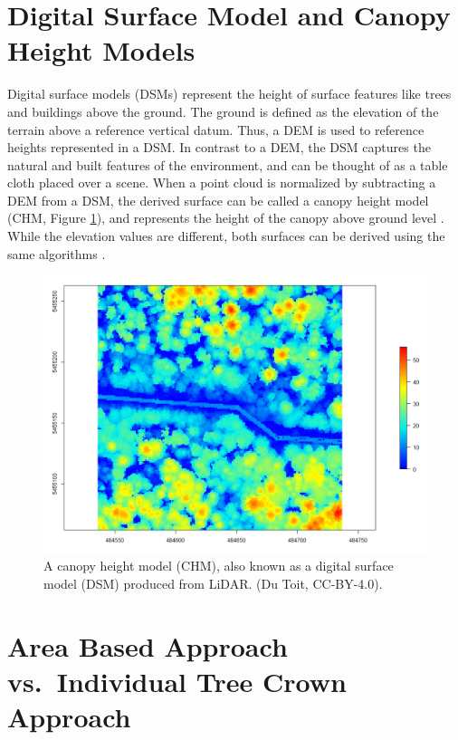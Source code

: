 \documentclass[
]{book}
\begin{document}
\hypertarget{digital-surface-model-and-canopy-height-models}{%
\section{Digital Surface Model and Canopy Height Models}\label{digital-surface-model-and-canopy-height-models}}

Digital surface models (DSMs) represent the height of surface features like trees and buildings above the ground. The ground is defined as the elevation of the terrain above a reference vertical datum. Thus, a DEM is used to reference heights represented in a DSM. In contrast to a DEM, the DSM captures the natural and built features of the environment, and can be thought of as a table cloth placed over a scene. When a point cloud is normalized by subtracting a DEM from a DSM, the derived surface can be called a canopy height model (CHM, Figure \ref{fig:15-las-CHM-2D}), and represents the height of the canopy above ground level \citep{white_best_2013}. While the elevation values are different, both surfaces can be derived using the same algorithms \citep{roussel_lidr_2021}.

\begin{figure}
\includegraphics[width=0.7\linewidth]{images/15-las-CHM-2D} \caption{A canopy height model (CHM), also known as a digital surface model (DSM) produced from LiDAR. (Du Toit, CC-BY-4.0).}\label{fig:15-las-CHM-2D}
\end{figure}

\hypertarget{area-based-approach-vs.-individual-tree-crown-approach}{%
\section{Area Based Approach vs.~Individual Tree Crown Approach}\label{area-based-approach-vs.-individual-tree-crown-approach}}
\end{document}

